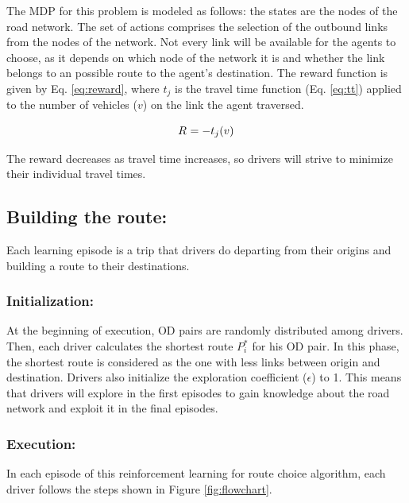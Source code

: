 \documentclass[12pt]{llncs}
\newcommand{\travTime}{\ensuremath{t_j}} 	%
\newcommand{\veh}{\ensuremath{v}}		%
\newcommand{\reward}[1][]{\ensuremath{R_#1}}	%
\begin{document}
The MDP for this problem is modeled as follows: the states are the nodes of the road network. The set of actions comprises the selection of the outbound links from the nodes of the network. Not every link will be available for the agents to choose, as it depends on which node of the network it is and whether the link belongs to an possible route to the agent's destination. The reward function is given by Eq. \eqref{eq:reward}, where $\travTime$ is the travel time function (Eq. \eqref{eq:tt}) applied to the number of vehicles ($\veh$) on the link the agent traversed.

\begin{equation}
\label{eq:reward}
\reward{} = - \travTime(\veh)
\end{equation}

The reward decreases as travel time increases, so drivers will strive to minimize their individual travel times.

\subsection{Building the route:}

Each learning episode is a trip that drivers do departing from their origins and building a route to their destinations.

\subsubsection{Initialization:}
At the beginning of execution, OD pairs are randomly distributed among drivers. Then, each driver calculates the shortest route $P_i^*$ for his OD pair. In this phase, the shortest route is considered as the one with less links between origin and destination. Drivers also initialize the exploration coefficient ($\epsilon$) to 1. This means that drivers will explore in the first episodes to gain knowledge about the road network and exploit it in the final episodes.

\subsubsection{Execution:}

In each episode of this reinforcement learning for route choice algorithm, each driver follows the steps shown in Figure \ref{fig:flowchart}.
\end{document}
